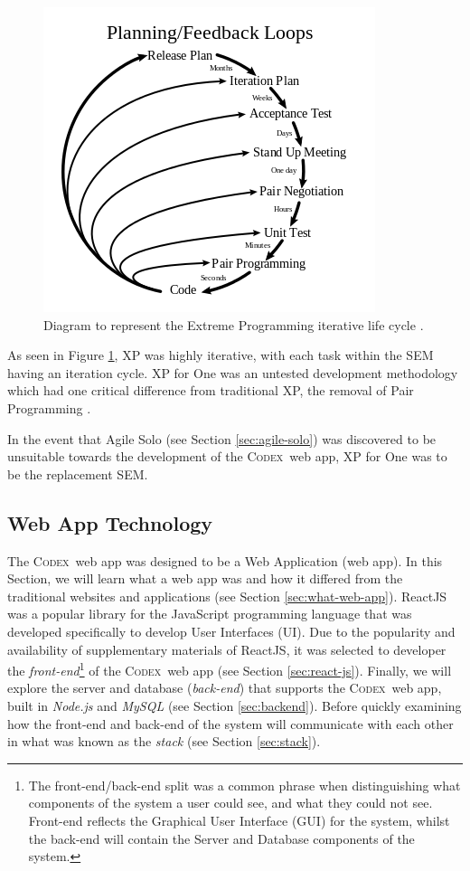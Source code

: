 \documentclass[final]{cmpreport}
\newcommand{\Codex}{\textsc{Codex}}
\begin{document}
			\begin{figure}[H]
				\centering
				\includegraphics[width=0.6\linewidth]{xp.png}
				\caption[Extreme Programming Diagram]{Diagram to represent the Extreme Programming iterative life cycle \citep{xp-diag}.} \label{fig:xp}
			\end{figure}
			
			As seen in Figure \ref{fig:xp}, XP was highly iterative, with each task within the SEM having an iteration cycle. XP for One was an untested development methodology which had one critical difference from traditional XP, the removal of Pair Programming \citep{SoloXP}. 
			
			In the event that Agile Solo (see Section \ref{sec:agile-solo}) was discovered to be unsuitable towards the development of the \Codex \ web app, XP for One was to be the replacement SEM.
			
		\subsection{Web App Technology} \label{sec:web-app}
		The \Codex \ web app was designed to be a Web Application (web app). In this Section, we will learn what a web app was and how it differed from the traditional websites and applications (see Section \ref{sec:what-web-app}). ReactJS was a popular library for the JavaScript programming language that was developed specifically to develop User Interfaces (UI). Due to the popularity and availability of supplementary materials of ReactJS, it was selected to developer the \textit{front-end}\footnote{The front-end/back-end split was a common phrase when distinguishing what components of the system a user could see, and what they could not see. Front-end reflects the Graphical User Interface (GUI) for the system, whilst the back-end will contain the Server and Database components of the system.} of  the \Codex \ web app (see Section \ref{sec:react-js}). Finally, we will explore the server and database (\textit{back-end}) that supports the \Codex \ web app, built in \textit{Node.js} and \textit{MySQL} (see Section \ref{sec:backend}). Before quickly examining how the front-end and back-end of the system will communicate with each other in what was known as the \emph{stack} (see Section \ref{sec:stack}).
		
\end{document}
